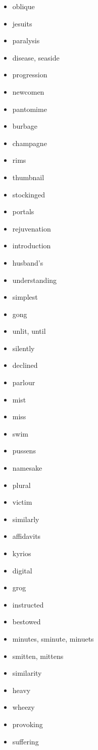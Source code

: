\documentclass{article}
\begin{document}
\begin{itemize}
    \item oblique
    \item jesuits
    \item paralysis
    \item disease, seaside
    \item progression
    \item newcomen
    \item pantomime
    \item burbage
    \item champagne
    \item rims
    \item thumbnail
    \item stockinged
    \item portals
    \item rejuvenation
    \item introduction
    \item husband's
    \item understanding
    \item simplest
    \item gong
    \item unlit, until
    \item silently
    \item declined
    \item parlour
    \item mist
    \item miss
    \item swim
    \item pussens
    \item namesake
    \item plural
    \item victim
    \item similarly
    \item affidavits
    \item kyrios
    \item digital
    \item grog
    \item instructed
    \item bestowed
    \item minutes, sminute, minuets
    \item smitten, mittens
    \item similarity
    \item heavy
    \item wheezy
    \item provoking
    \item suffering

\end{itemize}
\end{document}
